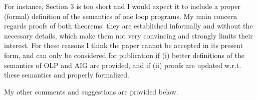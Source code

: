 
For instance, Section 3 is too short and I would expect it to include a 
proper (formal) definition of the semantics of one loop programs.
My main concern regards proofs of both theorems: they are established 
informally and without the necessary details, which make them not very 
convincing and strongly limits their interest.
For these reasons I think the paper cannot be accepted in its present form, 
and can only be considered for publication if (i) better definitions of the 
semantics of OLP and AIG are provided, and if (ii) proofs are updated w.r.t. 
these semantics and properly formalized.



My other comments and suggestions are provided below.

